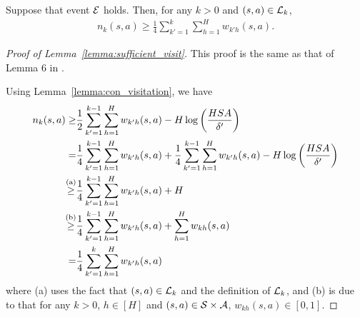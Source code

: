 
\begin{lemma} \label{lemma:sufficient_visit}
	Suppose that event $\mathcal{E}$ holds. Then, for any $k>0$ and $(s,a) \in \mathcal{L}_k$,
	\begin{align*}
		n_k(s,a) \geq \frac{1}{4} \sum_{k'=1}^{k} \sum_{h=1}^{H} w_{k'h}(s,a) .
	\end{align*}
\end{lemma}
\begin{proof}[Proof of Lemma~\ref{lemma:sufficient_visit}]
	This proof is the same as that of Lemma 6 in \citep{zanette2019tighter}.
	
	Using Lemma~\ref{lemma:con_visitation}, we have
	\begin{align*}
		n_k(s,a) \geq & \frac{1}{2} \sum_{k'=1}^{k-1} \sum_{h=1}^{H} w_{k'h}(s,a) - H \log \left( \frac{HSA}{\delta'} \right)
		\\
		= & \frac{1}{4} \sum_{k'=1}^{k-1} \sum_{h=1}^{H} w_{k'h}(s,a) + \frac{1}{4} \sum_{k'=1}^{k-1} \sum_{h=1}^{H} w_{k'h}(s,a) - H \log \left( \frac{HSA}{\delta'} \right)
		\\
		\overset{\textup{(a)}}{\geq} & \frac{1}{4} \sum_{k'=1}^{k-1} \sum_{h=1}^{H} w_{k'h}(s,a) + H
		\\
		\overset{\textup{(b)}}{\geq} & \frac{1}{4} \sum_{k'=1}^{k-1} \sum_{h=1}^{H} w_{k'h}(s,a) + \sum_{h=1}^{H} w_{kh}(s,a)
		\\
		= & \frac{1}{4} \sum_{k'=1}^{k} \sum_{h=1}^{H} w_{k'h}(s,a) 
	\end{align*}
	where (a) uses the fact that $(s,a) \in \mathcal{L}_{k}$ and the definition of $\mathcal{L}_{k}$, and (b) is due to that for any $k>0$, $h \in [H]$ and $(s,a) \in \mathcal{S} \times \mathcal{A}$, $w_{kh}(s,a) \in [0,1]$.
\end{proof}

